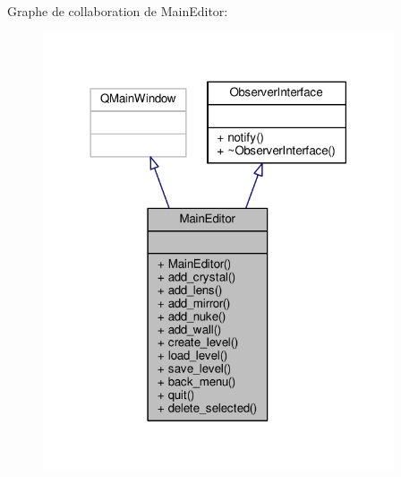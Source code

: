 Graphe de collaboration de Main\+Editor\+:
\nopagebreak
\begin{figure}[H]
\begin{center}
\leavevmode
\includegraphics[width=294pt]{db/d11/classMainEditor__coll__graph}
\end{center}
\end{figure}
